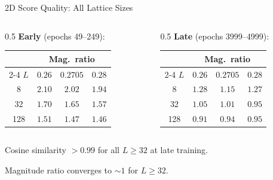 \documentclass[10pt,UTF8]{beamer}
\begin{document}
\begin{frame}{2D Score Quality: All Lattice Sizes}
\begin{columns}[T]
\begin{column}{0.5\textwidth}
    {\small \textbf{Early} (epochs 49--249):}
    \vspace{0.1cm}

    {\footnotesize
    \begin{tabular}{cccc}
    \toprule
     & \multicolumn{3}{c}{Mag.\ ratio} \\
    \cmidrule(lr){2-4}
    $L$ & $0.26$ & $0.2705$ & $0.28$ \\
    \midrule
    8   & $2.10$ & $2.02$ & $1.94$ \\
    32  & $1.70$ & $1.65$ & $1.57$ \\
    128 & $1.51$ & $1.47$ & $1.46$ \\
    \bottomrule
    \end{tabular}
    }
\end{column}
\begin{column}{0.5\textwidth}
    {\small \textbf{Late} (epochs 3999--4999):}
    \vspace{0.1cm}

    {\footnotesize
    \begin{tabular}{cccc}
    \toprule
     & \multicolumn{3}{c}{Mag.\ ratio} \\
    \cmidrule(lr){2-4}
    $L$ & $0.26$ & $0.2705$ & $0.28$ \\
    \midrule
    8   & $1.28$ & $1.15$ & $1.27$ \\
    32  & $1.05$ & $1.01$ & $0.95$ \\
    128 & $0.91$ & $0.94$ & $0.95$ \\
    \bottomrule
    \end{tabular}
    }
\end{column}
\end{columns}
\vspace{0.4cm}
Cosine similarity $>0.99$ for all $L\geq 32$ at late training.

Magnitude ratio converges to $\sim 1$ for $L\geq 32$.
\end{frame}
\end{document}
